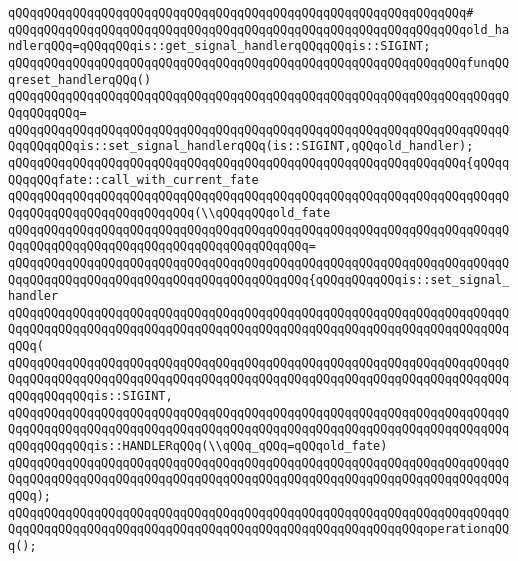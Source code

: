 \verb|qQQqqQQqqQQqqQQqqQQqqQQqqQQqqQQqqQQqqQQqqQQqqQQqqQQqqQQqqQQqqQQq#|\newline
\verb|qQQqqQQqqQQqqQQqqQQqqQQqqQQqqQQqqQQqqQQqqQQqqQQqqQQqqQQqqQQqqQQqold_handlerqQQq=qQQqqQQqis::get_signal_handlerqQQqqQQqis::SIGINT;|\newline
\newline
\verb|qQQqqQQqqQQqqQQqqQQqqQQqqQQqqQQqqQQqqQQqqQQqqQQqqQQqqQQqqQQqqQQqfunqQQqreset_handlerqQQq()|\newline
\verb|qQQqqQQqqQQqqQQqqQQqqQQqqQQqqQQqqQQqqQQqqQQqqQQqqQQqqQQqqQQqqQQqqQQqqQQqqQQqqQQq=|\newline
\verb|qQQqqQQqqQQqqQQqqQQqqQQqqQQqqQQqqQQqqQQqqQQqqQQqqQQqqQQqqQQqqQQqqQQqqQQqqQQqqQQqis::set_signal_handlerqQQq(is::SIGINT,qQQqold_handler);|\newline
\newline
\verb|qQQqqQQqqQQqqQQqqQQqqQQqqQQqqQQqqQQqqQQqqQQqqQQqqQQqqQQqqQQqqQQq{qQQqqQQqqQQqfate::call_with_current_fate|\newline
\verb|qQQqqQQqqQQqqQQqqQQqqQQqqQQqqQQqqQQqqQQqqQQqqQQqqQQqqQQqqQQqqQQqqQQqqQQqqQQqqQQqqQQqqQQqqQQqqQQq(\\qQQqqQQqold_fate|\newline
\verb|qQQqqQQqqQQqqQQqqQQqqQQqqQQqqQQqqQQqqQQqqQQqqQQqqQQqqQQqqQQqqQQqqQQqqQQqqQQqqQQqqQQqqQQqqQQqqQQqqQQqqQQqqQQqqQQq=|\newline
\verb|qQQqqQQqqQQqqQQqqQQqqQQqqQQqqQQqqQQqqQQqqQQqqQQqqQQqqQQqqQQqqQQqqQQqqQQqqQQqqQQqqQQqqQQqqQQqqQQqqQQqqQQqqQQqqQQq{qQQqqQQqqQQqis::set_signal_handler|\newline
\verb|qQQqqQQqqQQqqQQqqQQqqQQqqQQqqQQqqQQqqQQqqQQqqQQqqQQqqQQqqQQqqQQqqQQqqQQqqQQqqQQqqQQqqQQqqQQqqQQqqQQqqQQqqQQqqQQqqQQqqQQqqQQqqQQqqQQqqQQqqQQqqQQq(|\newline
\verb|qQQqqQQqqQQqqQQqqQQqqQQqqQQqqQQqqQQqqQQqqQQqqQQqqQQqqQQqqQQqqQQqqQQqqQQqqQQqqQQqqQQqqQQqqQQqqQQqqQQqqQQqqQQqqQQqqQQqqQQqqQQqqQQqqQQqqQQqqQQqqQQqqQQqqQQqis::SIGINT,|\newline
\verb|qQQqqQQqqQQqqQQqqQQqqQQqqQQqqQQqqQQqqQQqqQQqqQQqqQQqqQQqqQQqqQQqqQQqqQQqqQQqqQQqqQQqqQQqqQQqqQQqqQQqqQQqqQQqqQQqqQQqqQQqqQQqqQQqqQQqqQQqqQQqqQQqqQQqqQQqis::HANDLERqQQq(\\qQQq_qQQq=qQQqold_fate)|\newline
\verb|qQQqqQQqqQQqqQQqqQQqqQQqqQQqqQQqqQQqqQQqqQQqqQQqqQQqqQQqqQQqqQQqqQQqqQQqqQQqqQQqqQQqqQQqqQQqqQQqqQQqqQQqqQQqqQQqqQQqqQQqqQQqqQQqqQQqqQQqqQQqqQQq);|\newline
\newline
\verb|qQQqqQQqqQQqqQQqqQQqqQQqqQQqqQQqqQQqqQQqqQQqqQQqqQQqqQQqqQQqqQQqqQQqqQQqqQQqqQQqqQQqqQQqqQQqqQQqqQQqqQQqqQQqqQQqqQQqqQQqqQQqqQQqoperationqQQq();|\newline
